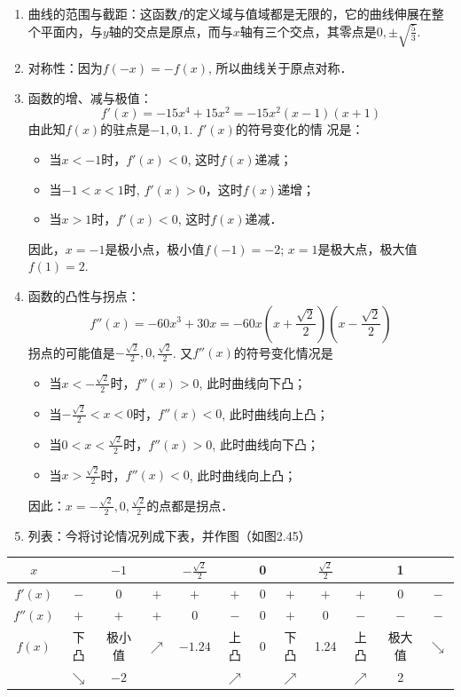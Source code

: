 \begin{solution}
\begin{enumerate}
\item 曲线的范围与截距：这函数$f$的定义域与值域都是无限的，它的曲线伸展在整个平面内，与$y$轴的交点是原点，而与$x$轴有三个交点，其零点是$0,\pm\sqrt{\frac{5}{3}}$.
\item 对称性：因为$f(-x)=-f(x)$, 所以曲线关于原点对称．
\item 函数的增、减与极值：
\[f' (x) =-15x^4+15x^2=-15x^2 (x-1) (x+1)\]
由此知$f(x)$的驻点是$-1, 0, 1$. $f'(x)$的符号变化的情
况是：
\begin{itemize}
    \item 当$x<-1$时，$f'(x)<0$, 这时$f(x)$递减；
    \item 当$-1<x<1$时, $f'(x)>0$，这时$f(x)$递增；
    \item 当$x>1$时，$f'(x)<0$, 这时$f(x)$递减．
\end{itemize}
因此，$x=-1$是极小点，极小值$f(-1)=-2$; $x=1$是极大点，极大值$f(1)=2$.
\item 函数的凸性与拐点：
\[f''(x)=-60x^3+30x=-60x\left(x+\frac{\sqrt{2}}{2}\right)\left(x-\frac{\sqrt{2}}{2}\right)\]
拐点的可能值是$-\frac{\sqrt{2}}{2},0,\frac{\sqrt{2}}{2}$. 又$f''(x)$的符号变化情况是
\begin{itemize}
    \item 当$x<-\frac{\sqrt{2}}{2}$时，$f''(x)>0$, 此时曲线向下凸；
    \item 当$-\frac{\sqrt{2}}{2}<x<0$时，$f''(x)<0$, 此时曲线向上凸；
    \item 当$0<x<\frac{\sqrt{2}}{2}$时，$f''(x)>0$, 此时曲线向下凸；
    \item 当$x>\frac{\sqrt{2}}{2}$时，$f''(x)<0$, 此时曲线向上凸；
\end{itemize}
因此：$x=-\frac{\sqrt{2}}{2},0,\frac{\sqrt{2}}{2}$的点都是拐点．

\item 列表：今将讨论情况列成下表，并作图（如图2.45）
\end{enumerate}    
\begin{center}\small
    \begin{tabular}{cccccccccccc}
    \hline
    $x$ & &$-1$&&$-\frac{\sqrt{2}}{2}$&&0&&$\frac{\sqrt{2}}{2}$&&1\\
    \hline
    $f'(x)$& $-$ & 0&$+$&$+$&$+$&0&$+$&$+$&$+$&0&$-$\\
    $f''(x)$&$+$&$+$&$+$&0&$-$&0&$+$&0&$-$&$-$&$-$\\
    $f(x)$&下凸&极小值& $\nearrow$  & $-1.24$&上凸 & 0& 下凸 &1.24& 上凸 & 极大值 & $\searrow$  \\
    & $\searrow $ &$-2$&&&$\nearrow $&&$\nearrow $&&$\nearrow $&2\\
    \hline
    \end{tabular}
    \end{center}
    

\end{solution}
